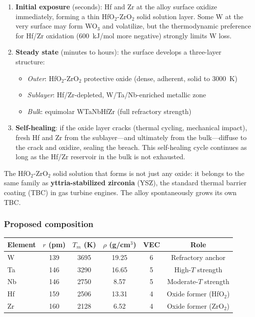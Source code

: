 \documentclass[12pt,letterpaper]{article}
\theoremstyle{definition}
\begin{document}
\begin{enumerate}
  \item \textbf{Initial exposure} (seconds): Hf and Zr at the alloy surface oxidize immediately, forming a thin HfO$_2$-ZrO$_2$ solid solution layer.  Some W at the very surface may form WO$_3$ and volatilize, but the thermodynamic preference for Hf/Zr oxidation (600~kJ/mol more negative) strongly limits W loss.
  \item \textbf{Steady state} (minutes to hours): the surface develops a three-layer structure:
    \begin{itemize}
      \item \emph{Outer}: HfO$_2$-ZrO$_2$ protective oxide (dense, adherent, solid to 3000~K)
      \item \emph{Sublayer}: Hf/Zr-depleted, W/Ta/Nb-enriched metallic zone
      \item \emph{Bulk}: equimolar WTaNbHfZr (full refractory strength)
    \end{itemize}
  \item \textbf{Self-healing}: if the oxide layer cracks (thermal cycling, mechanical impact), fresh Hf and Zr from the sublayer---and ultimately from the bulk---diffuse to the crack and oxidize, sealing the breach.  This self-healing cycle continues as long as the Hf/Zr reservoir in the bulk is not exhausted.
\end{enumerate}

The HfO$_2$-ZrO$_2$ solid solution that forms is not just any oxide: it belongs to the same family as \textbf{yttria-stabilized zirconia} (YSZ), the standard thermal barrier coating (TBC) in gas turbine engines.  The alloy spontaneously grows its own TBC.

\subsubsection{Proposed composition}

\begin{center}
\begin{tabular}{@{}lccccc@{}}
\toprule
Element & $r$ (pm) & $T_m$ (K) & $\rho$ (g/cm$^3$) & VEC & Role \\
\midrule
W  & 139 & 3695 & 19.25 & 6 & Refractory anchor \\
Ta & 146 & 3290 & 16.65 & 5 & High-$T$ strength \\
Nb & 146 & 2750 & 8.57  & 5 & Moderate-$T$ strength \\
Hf & 159 & 2506 & 13.31 & 4 & Oxide former (HfO$_2$) \\
Zr & 160 & 2128 & 6.52  & 4 & Oxide former (ZrO$_2$) \\
\bottomrule
\end{tabular}
\end{center}
\end{document}
